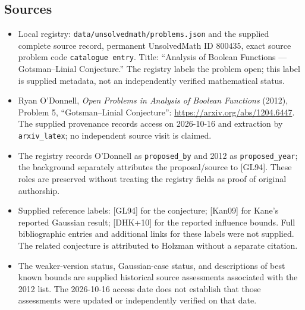 \documentclass[11pt]{article}
\begin{document}
\subsection{Sources}
\begin{itemize}
\item Local registry: \texttt{data/unsolvedmath/problems.json} and the supplied complete source record, permanent UnsolvedMath ID \(800435\), exact source problem code \texttt{catalogue entry}. Title: ``Analysis of Boolean Functions --- Gotsman--Linial Conjecture.'' The registry labels the problem open; this label is supplied metadata, not an independently verified mathematical status.
\item Ryan O'Donnell, \emph{Open Problems in Analysis of Boolean Functions} (2012), Problem 5, ``Gotsman--Linial Conjecture'': \url{https://arxiv.org/abs/1204.6447}. The supplied provenance records access on 2026-10-16 and extraction by \texttt{arxiv\_latex}; no independent source visit is claimed.
\item The registry records O'Donnell as \texttt{proposed\_by} and 2012 as \texttt{proposed\_year}; the background separately attributes the proposal/source to [GL94]. These roles are preserved without treating the registry fields as proof of original authorship.
\item Supplied reference labels: [GL94] for the conjecture; [Kan09] for Kane's reported Gaussian result; [DHK+10] for the reported influence bounds. Full bibliographic entries and additional links for these labels were not supplied. The related conjecture is attributed to Holzman without a separate citation.
\item The weaker-version status, Gaussian-case status, and descriptions of best known bounds are supplied historical source assessments associated with the 2012 list. The 2026-10-16 access date does not establish that those assessments were updated or independently verified on that date.
\end{itemize}
\end{document}
